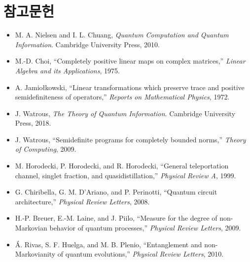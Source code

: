 \documentclass[11pt,a4paper]{article}
\theoremstyle{definition}
\theoremstyle{plain}
\theoremstyle{remark}
\begin{document}
\section*{참고문헌}
\begin{itemize}
  \item M. A. Nielsen and I. L. Chuang, \textit{Quantum Computation and Quantum Information}. Cambridge University Press, 2010.
  \item M.-D. Choi, ``Completely positive linear maps on complex matrices,'' \textit{Linear Algebra and its Applications}, 1975.
  \item A. Jamio{\l}kowski, ``Linear transformations which preserve trace and positive semidefiniteness of operators,'' \textit{Reports on Mathematical Physics}, 1972.
  \item J. Watrous, \textit{The Theory of Quantum Information}. Cambridge University Press, 2018.
  \item J. Watrous, ``Semidefinite programs for completely bounded norms,'' \textit{Theory of Computing}, 2009.
  \item M. Horodecki, P. Horodecki, and R. Horodecki, ``General teleportation channel, singlet fraction, and quasidistillation,'' \textit{Physical Review A}, 1999.
  \item G. Chiribella, G. M. D'Ariano, and P. Perinotti, ``Quantum circuit architecture,'' \textit{Physical Review Letters}, 2008.
  \item H.-P. Breuer, E.-M. Laine, and J. Piilo, ``Measure for the degree of non-Markovian behavior of quantum processes,'' \textit{Physical Review Letters}, 2009.
  \item Á. Rivas, S. F. Huelga, and M. B. Plenio, ``Entanglement and non-Markovianity of quantum evolutions,'' \textit{Physical Review Letters}, 2010.
\end{itemize}
\end{document}
